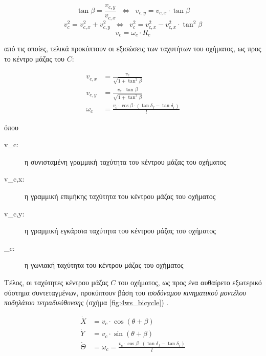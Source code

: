 {\begin{equation}
	\tan{\beta} = \frac{v_{c,y}}{v_{c,x}} \;\;\Leftrightarrow\;\; v_{c,y} = v_{c,x} \cdot \tan{\beta}
	\label{eq:vel_beta}
\end{equation}
\begin{equation}
	v_c^2 = v_{c,x}^2 + v_{c,y}^2 \;\;\Leftrightarrow\;\; v_{c}^2 = v_{c,x}^2 - v_{c,x}^2  \cdot \tan^2{\beta}
	\label{eq:v_squared}
\end{equation}
\begin{equation}
	v_c = \omega_c \cdot R_c
	\label{eq:lin_ang_relationship}
\end{equation}

\noindent
από τις οποίες, τελικά προκύπτουν οι εξισώσεις των ταχυτήτων του οχήματος, ως προς το κέντρο μάζας του $C$:

\begin{align}
	v_{c,x} &= \frac{v_c}{\sqrt{1+\tan^2\beta}}
	\label{eq:lin_vel_x}\\
	v_{c,y} &= \frac{v_c \cdot \tan{\beta}}{\sqrt{1+\tan^2\beta}}
	\label{eq:lin_vel_y}\\
	\omega_c &= \frac{v_c \cdot \cos{\beta} \cdot (\tan{\delta_f - \tan{\delta_r}})}{l}
	\label{eq:ang_vel}
\end{align}

\bigskip\noindent
όπου
\begin{description}
	\item[v_c:] η συνισταμένη γραμμική ταχύτητα του κέντρου μάζας του οχήματος
	\item[v_{c,x}:] η γραμμική επιμήκης ταχύτητα του κέντρου μάζας του οχήματος
	\item[v_{c,y}:] η γραμμική εγκάρσια ταχύτητα του κέντρου μάζας του οχήματος
	\item[\omega_c:] η γωνιακή ταχύτητα του κέντρου μάζας του οχήματος
\end{description}

\bigskip\bigskip
Τέλος, οι ταχύτητες κέντρου μάζας $C$ του οχήματος, ως προς ένα αυθαίρετο εξωτερικό σύστημα συντεταγμένων, προκύπτουν βάση του \textit{ισοδύναμου κινηματικού μοντέλου ποδηλάτου τετραδιεύθυνσης} (σχήμα \ref{fig:4ws_bicycle}) \cite{4ws_trajectory_planning}.

\begin{align}
	\dot X &= v_c \cdot \cos(\theta + \beta)
	\label{eq:x_dot}\\
	\dot Y &= v_c \cdot \sin(\theta + \beta)
	\label{eq:y_dot}\\
	\dot \Theta &= \omega_c = \frac{v_c \cdot \cos{\beta} \cdot (\tan{\delta_f - \tan{\delta_r}})}{l}
	\label{eq:th_dot}
\end{align}

}
